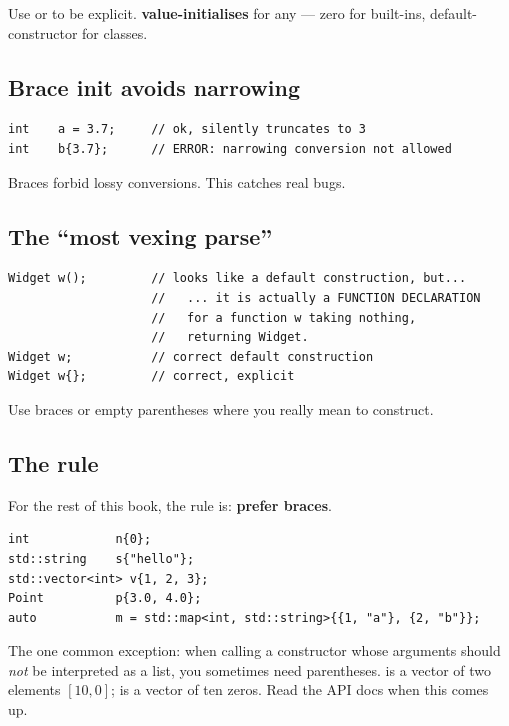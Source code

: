 Use  or  to be explicit.
 \textbf{value-initialises}  for any 
--- zero for built-ins, default-constructor for classes.

\subsection{Brace init avoids narrowing}

\begin{lstlisting}
int    a = 3.7;     // ok, silently truncates to 3
int    b{3.7};      // ERROR: narrowing conversion not allowed
\end{lstlisting}

Braces forbid lossy conversions. This catches real bugs.

\subsection{The ``most vexing parse''}

\begin{lstlisting}
Widget w();         // looks like a default construction, but...
                    //   ... it is actually a FUNCTION DECLARATION
                    //   for a function w taking nothing,
                    //   returning Widget.
Widget w;           // correct default construction
Widget w{};         // correct, explicit
\end{lstlisting}

Use braces or empty parentheses where you really mean to construct.

\subsection{The rule}

For the rest of this book, the rule is: \textbf{prefer braces}.

\begin{lstlisting}
int            n{0};
std::string    s{"hello"};
std::vector<int> v{1, 2, 3};
Point          p{3.0, 4.0};
auto           m = std::map<int, std::string>{{1, "a"}, {2, "b"}};
\end{lstlisting}

The one common exception: when calling a constructor whose arguments
should \emph{not} be interpreted as a list, you sometimes need
parentheses.  is a vector of two
elements $[10, 0]$;  is a vector of
ten zeros. Read the API docs when this comes up.

